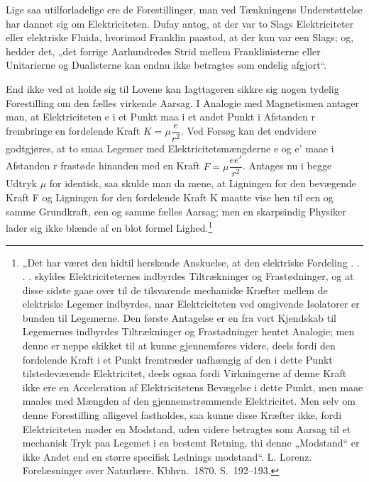 \documentclass[12pt,a4paper]{book}
\begin{document}
Lige saa utilforladelige ere de Forestillinger, man ved Tænkningens
Understøttelse har dannet sig om Elektriciteten. Dufay antog, at der
var to Slags Elektriciteter eller elektriske Fluida, hvorimod Franklin
paastod, at der kun var een Slags; og, hedder det, „det forrige
Aarhundredes Strid mellem Franklinisterne eller Unitarierne og
Dualisterne kan endnu ikke betragtes som endelig afgjort“.

End ikke ved at holde sig til Lovene kan Iagttageren sikkre sig nogen
tydelig Forestilling om den fælles virkende Aarsag. I Analogie med
Magnetismen antager man, at Elektriciteten e i et Punkt maa i et andet
Punkt i Afstanden r frembringe en fordelende Kraft
$K = \mu \dfrac{e}{r^{2}}$. Ved Forsøg kan det endvidere godtgjøres,
at to smaa Legemer med
Elektricitetsmængderne e og e' maae i Afstanden r frastøde hinanden
med en Kraft $F = \mu \dfrac{ee'}{r^{2}}$. Antages nu i begge Udtryk
$\mu$ for identisk, saa skulde man da mene, at Ligningen for den
bevægende Kraft F og Ligningen for den fordelende Kraft K maatte vise
hen til een og samme Grundkraft, een og samme fælles Aarsag; men en
skarpsindig Physiker lader sig ikke blænde af en blot formel
Lighed.\footnote{%
„Det har været den hidtil herskende Anskuelse, at den elektriske
Fordeling . . . . skyldes Elektriciteternes indbyrdes Tiltrækninger og
Frastødninger, og at disse sidste gaae over til de tilsvarende
mechaniske Kræfter mellem de elektriske Legemer indbyrdes, naar
Elektriciteten ved omgivende Isolatorer er bunden til Legemerne. Den
første Antagelse er en fra vort Kjendskab til Legemernes indbyrdes
Tiltrækninger og Frastødninger hentet Analogie; men denne er neppe
skikket til at kunne gjennemføres videre, deels fordi den fordelende
Kraft i et Punkt fremtræder uafhængig af den i dette Punkt
tilstedeværende Elektricitet, deels ogsaa fordi Virkningerne af denne
Kraft ikke ere en Acceleration af Elektricitetens Bevægelse i dette
Punkt, men maae maales med Mængden af den gjennemstrømmende
Elektricitet. Men selv om denne Forestilling alligevel fastholdes, saa
kunne disse Kræfter ikke, fordi Elektriciteten møder en Modstand, uden
videre betragtes som Aarsag til et mechanisk Tryk paa Legemet i en
bestemt Retning, thi denne „Modstand“ er ikke Andet end en større
specifisk Lednings\-%
modstand“. L. Lorenz. Forelæsninger over Naturlære. Kbhvn.\ 1870.
S.\ 192--193.}
\end{document}
